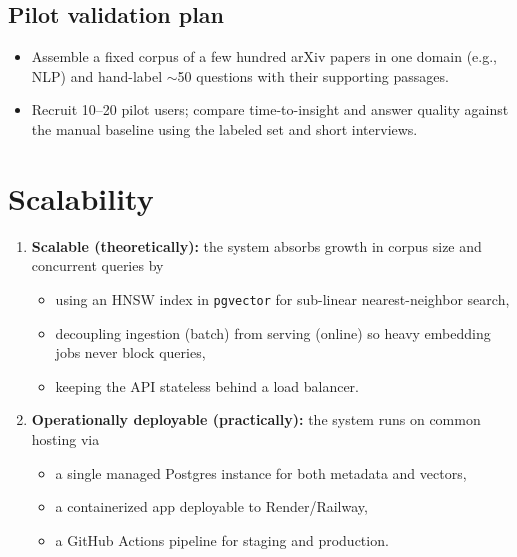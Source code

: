 \documentclass[11pt,a4paper]{article}
\begin{document}
\subsection{Pilot validation plan}
\begin{itemize}[leftmargin=0.7cm]
    \item Assemble a fixed corpus of a few hundred arXiv papers in one domain (e.g., NLP) and hand-label $\sim$50 questions with their supporting passages.
    \item Recruit 10--20 pilot users; compare time-to-insight and answer quality against the manual baseline using the labeled set and short interviews.
\end{itemize}

\section{Scalability}
\begin{enumerate}[leftmargin=0.7cm]
    \item \textbf{Scalable (theoretically):} the system absorbs growth in corpus size and concurrent queries by
    \begin{itemize}[leftmargin=0.7cm]
        \item using an HNSW index in \texttt{pgvector} for sub-linear nearest-neighbor search,
        \item decoupling ingestion (batch) from serving (online) so heavy embedding jobs never block queries,
        \item keeping the API stateless behind a load balancer.
    \end{itemize}
    \item \textbf{Operationally deployable (practically):} the system runs on common hosting via
    \begin{itemize}[leftmargin=0.7cm]
        \item a single managed Postgres instance for both metadata and vectors,
        \item a containerized app deployable to Render/Railway,
        \item a GitHub Actions pipeline for staging and production.
    \end{itemize}
\end{enumerate}
\end{document}
